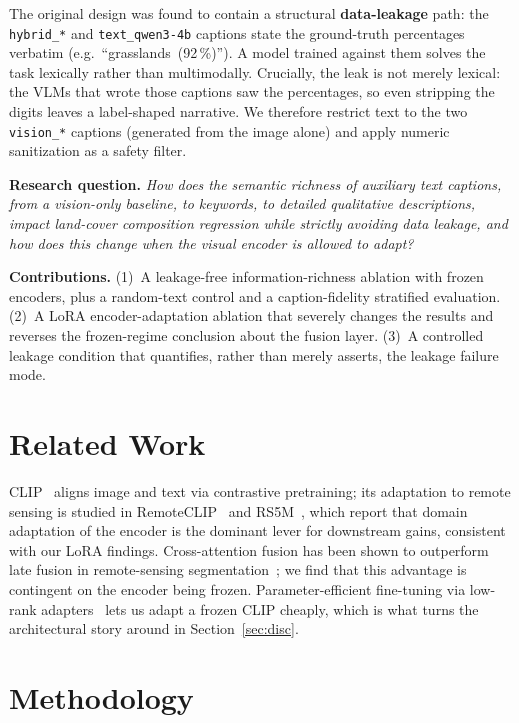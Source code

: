 \documentclass[conference]{IEEEtran}
\begin{document}
The original design was found to contain a structural \textbf{data-leakage}
path: the \texttt{hybrid\_*} and \texttt{text\_qwen3-4b} captions state the
ground-truth percentages verbatim (e.g.\ ``grasslands~(92\,\%)''). A model
trained against them solves the task lexically rather than multimodally.
Crucially, the leak is not merely lexical: the VLMs that wrote those captions
saw the percentages, so even stripping the digits leaves a label-shaped
narrative. We therefore restrict text to the two \texttt{vision\_*} captions
(generated from the image alone) and apply numeric sanitization as a safety
filter.

\textbf{Research question.} \emph{How does the semantic richness of auxiliary
text captions, from a vision-only baseline, to keywords, to detailed
qualitative descriptions, impact land-cover composition regression while
strictly avoiding data leakage, and how does this change when the visual
encoder is allowed to adapt?}

\textbf{Contributions.}
(1)~A leakage-free information-richness ablation with frozen encoders, plus a
random-text control and a caption-fidelity stratified evaluation.
(2)~A LoRA encoder-adaptation ablation that severely changes the results and
reverses the frozen-regime conclusion about the fusion layer.
(3)~A controlled leakage condition that quantifies, rather than merely asserts,
the leakage failure mode.

\section{Related Work}

CLIP~\cite{clip} aligns image and text via contrastive pretraining; its
adaptation to remote sensing is studied in RemoteCLIP~\cite{remoteclip} and
RS5M~\cite{rs5m}, which report that domain adaptation of the encoder is the
dominant lever for downstream gains, consistent with our LoRA findings.
Cross-attention fusion has been shown to outperform late fusion in
remote-sensing segmentation~\cite{ftransunet}; we find that this advantage is
contingent on the encoder being frozen. Parameter-efficient fine-tuning via
low-rank adapters~\cite{lora} lets us adapt a frozen CLIP cheaply, which is
what turns the architectural story around in Section~\ref{sec:disc}.

\section{Methodology}
\end{document}
